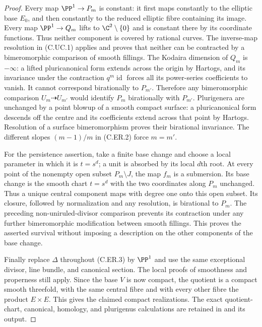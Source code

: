 \begin{proof}
Every map $\PP^1\to P_m$ is constant: it first maps constantly
to the elliptic base $E_0$, and then constantly to the reduced
elliptic fibre containing its image. Every map $\PP^1\to Q_m$
lifts to $\C^2\setminus\{0\}$ and is constant there by its
coordinate functions. Thus neither component is covered by
rational curves. The inverse-map resolution in (C.UC.1) applies
and proves that neither can be contracted by a bimeromorphic
comparison of smooth fillings. The Kodaira dimension of $Q_m$
is $-\infty$: a lifted pluricanonical form extends across the
origin by Hartogs, and its invariance under the contraction
$q^m\operatorname{id}$ forces all its power-series coefficients
to vanish. It cannot correspond birationally to $P_{m'}$.
Therefore any bimeromorphic comparison $U_m\dashrightarrow U_{m'}$
would identify $P_m$ birationally with $P_{m'}$.
Plurigenera are unchanged by a point blowup of a smooth compact
surface: a pluricanonical form descends off the centre and its
coefficients extend across that point by Hartogs. Resolution of
a surface bimeromorphism proves their birational invariance.
The different slopes $(m-1)/m$ in (C.ER.2) force $m=m'$.

For the persistence assertion, take a finite base change and choose
a local parameter in which it is $t=s^d$; a unit is absorbed by
its local $d$th root. At every point of the nonempty open subset
$P_m\setminus J$, the map $f_m$ is a submersion. Its base change
is the smooth chart $t=s^d$ with the two coordinates along $P_m$
unchanged. Thus a unique central component maps with degree one
onto this open subset. Its closure, followed by normalization and
any resolution, is birational to $P_m$. The preceding
non-uniruled-divisor comparison prevents its contraction under
any further bimeromorphic modification between smooth fillings.
This proves the asserted survival without imposing a description
on the other components of the base change.

Finally replace $\Delta$ throughout (C.ER.3) by $\PP^1$ and use
the same exceptional divisor, line bundle, and canonical section.
The local proofs of smoothness and properness still apply. Since
the base $V$ is now compact, the quotient is a compact smooth
threefold, with the same central fibre and with every other fibre
the product $E\times E$. This gives the claimed compact realizations.
The exact quotient-chart, canonical, homology, and plurigenus
calculations are retained in  and
its output.
\end{proof}

